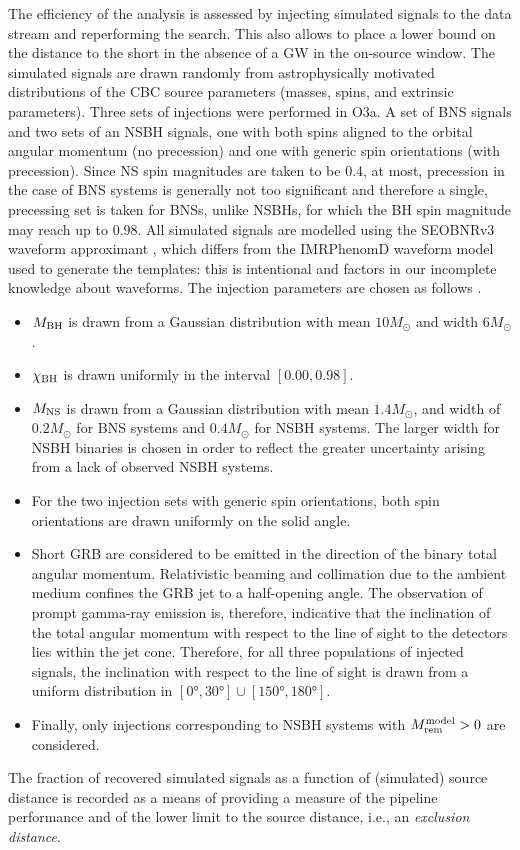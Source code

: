 \documentclass[binding=0.6cm, LaM]{sapthesis}
\begin{document}
        The efficiency of the analysis is assessed by injecting simulated signals to the data stream and reperforming the search.
 	This also allows to place a lower bound on the distance to the short in the absence of a GW in the on-source window. 
        The simulated signals are drawn randomly from astrophysically motivated distributions of the CBC source parameters (masses, spins, and extrinsic parameters).
	Three sets of injections were performed in O3a.  A set of BNS signals and two sets of an NSBH signals, one with both spins aligned to the orbital angular momentum (no precession) and one with generic spin orientations (with precession).  Since NS spin magnitudes are taken to be 0.4, at most, precession in the case of BNS systems is generally not too significant and therefore a single, precessing set is taken for BNSs, unlike NSBHs, for which the BH spin magnitude may reach up to 0.98.
	All simulated signals are modelled using the {\ttfamily SEOBNRv3} waveform approximant \cite{103,173,174}, which differs from the {\ttfamily IMRPhenomD} waveform model used to generate the templates: this is intentional and factors in our incomplete knowledge about waveforms.
	The injection parameters are chosen as follows \cite{43}.
        \begin{itemize}
        \item $M_{\rm BH}$ is drawn from a Gaussian distribution with mean $10M_\odot$ and width $6M_\odot$.
        \item $\chi_{\rm BH}$ is drawn uniformly in the interval $[0.00, 0.98]$.
        \item $M_{\rm NS}$ is drawn from a Gaussian distribution with mean $1.4M_\odot$, and width of $0.2M_\odot$ for BNS systems and $0.4M_\odot$ for NSBH systems.
          The larger width for NSBH binaries is chosen in order to reflect the greater uncertainty arising from a lack of observed NSBH systems. 
        \item For the two injection sets with generic spin orientations, both spin orientations are drawn uniformly on the solid angle. 
        \item Short GRB are considered to be emitted in the direction of the binary total angular momentum.
          Relativistic beaming and collimation due to the ambient medium confines the GRB jet to a half-opening angle. 
          The observation of prompt gamma-ray emission is, therefore, indicative that the inclination of the total angular momentum 
          with respect to the line of sight to the detectors lies within the jet cone.
          Therefore, for all three populations of injected signals,
          the inclination with respect to the line of sight is drawn from a uniform distribution in $[\ang{0}, \ang{30}] \cup [\ang{150}, \ang{180}]$.
        \item Finally, only injections corresponding to NSBH systems with $M_{\rm rem}^{\rm model}>0$ are considered.
        \end{itemize}
        The fraction of recovered simulated signals as a function of (simulated) source distance is recorded as a means of providing a measure of the pipeline performance 
	and of the lower limit to the source distance, i.e., an \emph{exclusion distance}.
\end{document}
